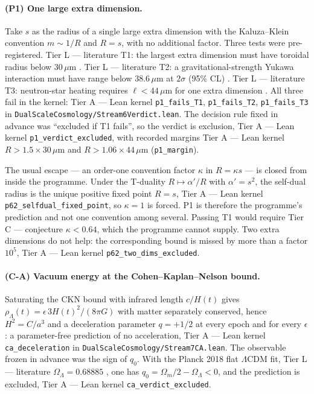 \documentclass[11pt,a4paper]{article}
\theoremstyle{remark}
\newcommand{\tierA}{\colorbox{green!15}{\textsf{\scriptsize Tier A --- Lean kernel}}}
\newcommand{\tierL}{\colorbox{blue!10}{\textsf{\scriptsize Tier L --- literature}}}
\newcommand{\tierC}{\colorbox{orange!15}{\textsf{\scriptsize Tier C --- conjecture}}}
\newcommand{\lean}[1]{\texttt{#1}}
\begin{document}
\paragraph{(P1) One large extra dimension.}
Take $s$ as the radius of a single large extra dimension with the Kaluza--Klein convention
$m \sim 1/R$ and $R = s$, with no additional factor. Three tests were pre-registered. \tierL{}
T1: the largest extra dimension must have toroidal radius below $30\,\mu\mathrm{m}$
\cite{LeeAdelberger2020}. \tierL{} T2: a gravitational-strength Yukawa interaction must have
range below $38.6\,\mu\mathrm{m}$ at $2\sigma$ (95\% CL) \cite{LeeAdelberger2020}. \tierL{} T3:
neutron-star heating requires $\ell < 44\,\mu\mathrm{m}$ for one extra dimension
\cite{MVV2023}. All three fail in the kernel: \tierA{} \lean{p1\_fails\_T1},
\lean{p1\_fails\_T2}, \lean{p1\_fails\_T3} in
\lean{DualScaleCosmology/Stream6Verdict.lean}. The decision rule fixed in advance was
``excluded if T1 fails'', so the verdict is exclusion, \tierA{} \lean{p1\_verdict\_excluded}, with
recorded margins \tierA{} $R > 1.5\times 30\,\mu\mathrm{m}$ and $R > 1.06\times 44\,\mu\mathrm{m}$
(\lean{p1\_margin}).

The usual escape --- an order-one convention factor $\kappa$ in $R = \kappa s$ --- is closed
from inside the programme. Under the T-duality $R \mapsto \alpha'/R$ with $\alpha' = s^2$, the
self-dual radius is the unique positive fixed point $R = s$, \tierA{}
\lean{p62\_selfdual\_fixed\_point}, so $\kappa = 1$ is forced. P1 is therefore the programme's
prediction and not one convention among several. Passing T1 would require \tierC{}
$\kappa < 0.64$, which the programme cannot supply. Two extra dimensions do not help: the
corresponding bound is missed by more than a factor $10^5$, \tierA{}
\lean{p62\_two\_dims\_excluded}.

\paragraph{(C-A) Vacuum energy at the Cohen--Kaplan--Nelson bound.}
Saturating the CKN bound \cite{CKN1999} with infrared length $c/H(t)$ gives
$\rho_\Lambda(t) = \epsilon\,3H(t)^2/(8\pi G)$ with matter separately conserved, hence
$H^2 = C/a^3$ and a deceleration parameter $q = +1/2$ at every epoch and for every $\epsilon$:
a parameter-free prediction of no acceleration, \tierA{} \lean{ca\_deceleration} in
\lean{DualScaleCosmology/Stream7CA.lean}. The observable frozen in advance was the sign of
$q_0$. With the Planck 2018 flat $\Lambda$CDM fit, \tierL{} $\Omega_\Lambda = 0.68885$
\cite{Planck2018VI}, one has $q_0 = \Omega_m/2 - \Omega_\Lambda < 0$, and the prediction is
excluded, \tierA{} \lean{ca\_verdict\_excluded}.
\end{document}
